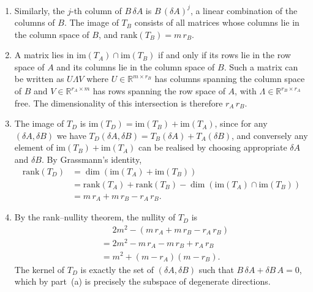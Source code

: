 \documentclass[11pt]{article}
\newcommand{\R}{\mathbb{R}}
\newcommand{\rank}{\mathrm{rank}}
\newcommand{\im}{\mathrm{im}}
\begin{document}
\begin{solution}
\begin{enumerate}
\begin{enumerate}
        \item
            Similarly, the $j$-th column of $B\,\delta\!A$ is
                $B\,(\delta\!A)^j$,
            a linear combination of the columns of $B$.
            The image of $T_B$ consists of all matrices whose columns lie in
            the column space of $B$, and
                $\rank(T_B) = m\,r_B$.

        \item
            A matrix lies in
                $\im(T_A) \cap \im(T_B)$
            if and only if its rows lie in the row space of $A$ and its
            columns lie in the column space of $B$.
            Such a matrix can be written as $U \Lambda V$ where
            $U \in \R^{m \times r_B}$ has columns spanning the column space
            of $B$ and $V \in \R^{r_A \times m}$ has rows spanning the row
            space of $A$, with $\Lambda \in \R^{r_B \times r_A}$ free.
            The dimensionality of this intersection is therefore $r_A\,r_B$.

        \item
            The image of $T_D$ is
                $\im(T_D) = \im(T_B) + \im(T_A)$,
            since for any $(\delta\!A, \delta\!B)$ we have
                $T_D(\delta\!A, \delta\!B) = T_B(\delta\!A) + T_A(\delta\!B)$,
            and conversely any element of $\im(T_B) + \im(T_A)$ can be
            realised by choosing appropriate $\delta\!A$ and $\delta\!B$.
            By Grassmann's identity,
            \begin{align*}
                \rank(T_D)
                &= \dim(\im(T_A) + \im(T_B))
            \\  &= \rank(T_A) + \rank(T_B)
                    - \dim(\im(T_A) \cap \im(T_B))
            \\  &= m\,r_A + m\,r_B - r_A\,r_B.
            \end{align*}

        \item
            By the rank--nullity theorem, the nullity of $T_D$ is
            \begin{align*}
                &\mathrel{\phantom{=}} 2m^2 - (m\,r_A + m\,r_B - r_A\,r_B)
            \\  &= 2m^2 - m\,r_A - m\,r_B + r_A\,r_B
            \\  &= m^2 + (m - r_A)(m - r_B).
            \end{align*}
            The kernel of $T_D$ is exactly the set of $(\delta\!A, \delta\!B)$
            such that $B\,\delta\!A + \delta\!B\, A = 0$, which by part~(a)
            is precisely the subspace of degenerate directions. \qedhere
    \end{enumerate}
\end{enumerate}


\end{solution}
\end{document}
